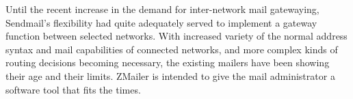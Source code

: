 Until the recent increase in the demand for inter-network mail gatewaying,
Sendmail's flexibility had quite adequately served to implement a gateway
function between selected networks.  With increased variety of the normal
address syntax and mail capabilities of connected networks, and more complex
kinds of routing decisions becoming necessary, the existing mailers have
been showing their age and their limits.  ZMailer is intended to give the
mail administrator a software tool that fits the times.
